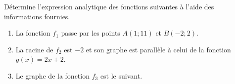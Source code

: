 %
%
    Détermine l'expression analytique des fonctions suivantes à l'aide des informations fournies.
    \begin{enumerate}
        \item La fonction $f_1$ passe par les points $A(1;11)$ et $B(-2;2)$.

        \item La racine de $f_2$ est $-2$ et son graphe est parallèle à celui de la fonction \\$g(x) = 2x + 2$.
        \item Le graphe de la fonction $f_3$ est le suivant. \hfil
    \end{enumerate}
